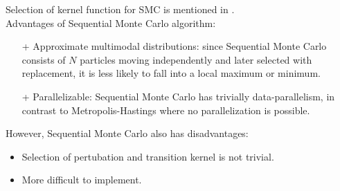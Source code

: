 Selection of kernel function for SMC is mentioned in \cite{silk2012optimizing}.\\
Advantages of Sequential Monte Carlo algorithm:
\begin{itemize}
    \item[+] Approximate multimodal distributions: since Sequential Monte Carlo consists of $N$
          particles moving independently and later selected with replacement, it is less likely to fall
          into a local maximum or minimum.
    \item[+] Parallelizable: Sequential Monte Carlo has trivially data-parallelism, in contrast to
          Metropolis-Hastings where no parallelization is possible.
\end{itemize}
However, Sequential Monte Carlo also has disadvantages:
\begin{itemize}
    \item Selection of pertubation and transition kernel is not trivial.
    \item More difficult to implement.
\end{itemize}

